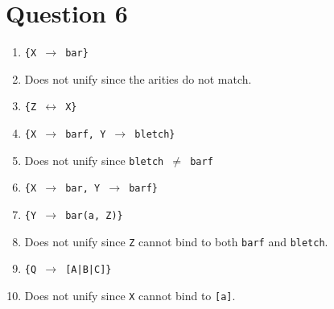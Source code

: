\documentclass[13pt]{article}
\begin{document}
\section*{Question 6}
\begin{enumerate}[label=(\alph*)]
\item \texttt{\{X $\to$ bar\}}
\item Does not unify since the arities do not match.
\item \texttt{\{Z $\leftrightarrow$ X\}}
\item \texttt{\{X $\to$ barf, Y $\to$ bletch\}}
\item Does not unify since \texttt{bletch $\neq$ barf}
\item \texttt{\{X $\to$ bar, Y $\to$ barf\}}
\item \texttt{\{Y $\to$ bar(a, Z)\}}
\item Does not unify since \texttt{Z} cannot bind to both \texttt{barf} and \texttt{bletch}.
\item \texttt{\{Q $\to$ [A|B|C]\}}
\item Does not unify since \texttt{X} cannot bind to \texttt{[a]}.
\end{enumerate}
\end{document}

